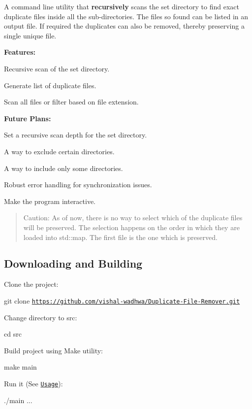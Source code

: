 A command line utility that {\bfseries recursively} scans the set directory to find exact duplicate files inside all the sub-\/directories. The files so found can be listed in an output file. If required the duplicates can also be removed, thereby preserving a single unique file.

{\bfseries Features\+:}
\begin{DoxyEnumerate}
\item Recursive scan of the set directory.
\item Generate list of duplicate files.
\item Scan all files or filter based on file extension.
\end{DoxyEnumerate}

{\bfseries Future Plans\+:}
\begin{DoxyEnumerate}
\item Set a recursive scan depth for the set directory.
\item A way to exclude certain directories.
\item A way to include only some directories.
\item Robust error handling for synchronization issues.
\item Make the program interactive.
\end{DoxyEnumerate}

\begin{quote}
Caution\+: As of now, there is no way to select which of the duplicate files will be preserved. The selection happens on the order in which they are loaded into {\ttfamily std\+::map}. The first file is the one which is preserved. \end{quote}


\subsection*{Downloading and Building}


\begin{DoxyEnumerate}
\item Clone the project\+:

{\ttfamily git clone \href{https://github.com/vishal-wadhwa/Duplicate-File-Remover.git}{\tt https\+://github.\+com/vishal-\/wadhwa/\+Duplicate-\/\+File-\/\+Remover.\+git}}
\item Change directory to src\+:

{\ttfamily cd src}
\item Build project using Make utility\+:

{\ttfamily make main}
\item Run it (See \href{#use}{\tt Usage})\+:

{\ttfamily ./main ...}
\end{DoxyEnumerate}

